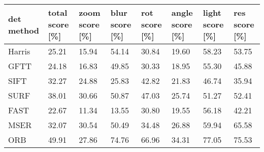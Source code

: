 \begin{tabular}{ l l l l l l l l }
	det method & total score [\%] & zoom score [\%] & blur score [\%] & rot score [\%] & angle score [\%] & light score [\%] & res score [\%] \\
	\hline
	 Harris & 25.21 & 15.94 & 54.14 & 30.84 & 19.60 & 58.23 & 53.75 \\
	 GFTT & 24.18 & 16.83 & 49.85 & 30.33 & 18.95 & 55.30 & 45.88 \\
	 SIFT & 32.27 & 24.88 & 25.83 & 42.82 & 21.83 & 46.74 & 35.94 \\
	 SURF & 38.01 & 30.66 & 50.87 & 47.03 & 25.74 & 51.27 & 52.41 \\
	 FAST & 22.67 & 11.34 & 13.55 & 30.80 & 19.55 & 56.18 & 42.21 \\
	 MSER & 32.07 & 30.54 & 50.49 & 34.48 & 26.88 & 59.94 & 65.58 \\
	 ORB & 49.91 & 27.86 & 74.76 & 66.96 & 34.31 & 77.05 & 75.53
\end{tabular}